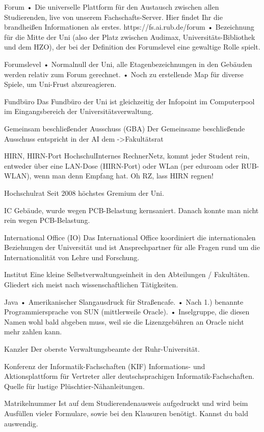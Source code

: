 Forum
•	Die universelle Plattform für den Austausch zwischen allen Studierenden, live von unserem Fachschafts-Server. Hier findet Ihr die brandheißen Informationen als erstes.
https://fs.ai.rub.de/forum
•	Bezeichnung für die Mitte der Uni (also der Platz zwischen Audimax, Universitäts-Bibliothek und dem HZO), der bei der Definition des Forumslevel eine gewaltige Rolle spielt.

Forumslevel
•	Normalnull der Uni, alle Etagenbezeichnungen in den Gebäuden werden relativ zum Forum gerechnet.
•	Noch zu erstellende Map für diverse Spiele, um Uni-Frust abzureagieren.

Fundbüro
Das Fundbüro der Uni ist gleichzeitig der Infopoint im Computerpool im Eingangsbereich der Universitätsverwaltung.

Gemeinsam beschließender Ausschuss (GBA)
Der Gemeinsame beschließende Ausschuss entspricht in der AI dem ->Fakultätsrat

HIRN, HIRN-Port
HochschulInternes RechnerNetz, kommt jeder Student rein, entweder über eine LAN-Dose (HIRN-Port) oder WLan (per eduroam oder RUB-WLAN), wenn man denn Empfang hat. Oh RZ, lass HIRN regnen!

Hochschulrat
Seit 2008 höchstes Gremium der Uni.

IC
Gebäude, wurde wegen PCB-Belastung kernsaniert. Danach konnte man nicht rein wegen PCB-Belastung.

International Office (IO)
Das International Office koordiniert die internationalen Beziehungen der Universität und ist Ansprechpartner für alle Fragen rund um die Internationalität von Lehre und Forschung. 

Institut
Eine kleine Selbstverwaltungseinheit in den Abteilungen / Fakultäten. Gliedert sich meist nach wissenschaftlichen Tätigkeiten.

Java
•	Amerikanischer Slangausdruck für Straßencafe.
•	Nach 1.) benannte Programmiersprache von SUN (mittlerweile Oracle).
•   Inselgruppe, die diesen Namen wohl bald abgeben muss, weil sie die Lizenzgebühren an Oracle nicht mehr zahlen kann.

Kanzler
Der oberste Verwaltungsbeamte der Ruhr-Universität.

Konferenz der Informatik-Fachschaften (KIF)
Informations- und Aktionsplattform für Vertreter aller deutschsprachigen Informatik-Fachschaften. Quelle für lustige Plüschtier-Nähanleitungen.

Matrikelnummer
Ist auf dem Studierendenausweis aufgedruckt und wird beim Ausfüllen vieler Formulare, sowie bei den Klausuren benötigt. Kannst du bald auswendig.

